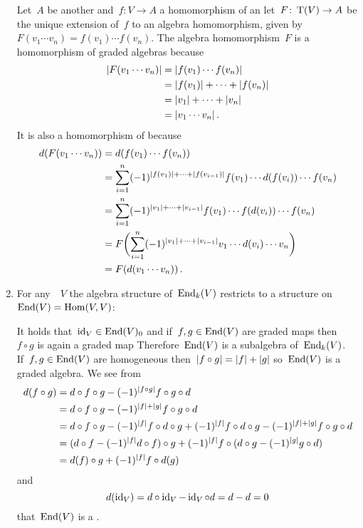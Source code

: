 \begin{enumerate}[start=2]
    Let~$A$ be another {\dga} and~$f \colon V \to A$ a homomorphism of {\dgvs} an let~$F \colon \operatorname{T}(V) \to A$ be the unique extension of~$f$ to an algebra homomorphism, given by~$F(v_1 \dotsm v_n) = f(v_1) \dotsm f(v_n)$.
    The algebra homomorphism~$F$ is a homomorphism of graded algebras because
    \begin{align*}
      \lvert F(v_1 \dotsm v_n)\rvert
      &=
      \lvert f(v_1) \dotsm f(v_n)\rvert
      \\
      &=
      \lvert f(v_1)\rvert + \dotsb + \lvert f(v_n)\rvert
      \\
      &=
      \lvert v_1\rvert + \dotsb + \lvert v_n\rvert
      \\
      &=
      \lvert v_1 \dotsm v_n\rvert \,.
    \end{align*}
    It is also a homomorphism of {\dgvs} because
    \begin{align*}
      d(F(v_1 \dotsm v_n))
      &=
      d( f(v_1) \dotsm f(v_n) )
      \\
      &=
      \sum_{i=1}^n
      (-1)^{\lvert f(v_1)\rvert + \dotsb + \lvert f(v_{i-1})\rvert }
      f(v_1) \dotsm d(f(v_i)) \dotsm f(v_n)
      \\
      &=
      \sum_{i=1}^n
      (-1)^{\lvert v_1\rvert + \dotsb + \lvert v_{i-1}\rvert }
      f(v_1) \dotsm f(d(v_i)) \dotsm f(v_n)
      \\
      &=
      F\biggl(
        \sum_{i=1}^n
        (-1)^{\lvert v_1\rvert + \dotsb + \lvert v_{i-1}\rvert }
        v_1 \dotsm d(v_i) \dotsm v_n
      \biggr)
      \\
      &=
      F(d(v_1 \dotsm v_n)) \,.
    \end{align*}
  \item
    For any~{\dgv}~$V$ the algebra structure of~$\operatorname{End}_k(V)$ restricts to a {\dga} structure on~$\operatorname{End}(V) = \operatorname{Hom}(V,V)$:
    
    It holds that~$\operatorname{id}_V \in \operatorname{End}(V)_0$ and if~$f, g \in \operatorname{End}(V)$ are graded maps then~$f \circ g$ is again a graded map
    Therefore~$\operatorname{End}(V)$ is a subalgebra of~$\operatorname{End}_k(V)$.
    If~$f, g \in \operatorname{End}(V)$ are homogeneous then~$\lvert f \circ g\rvert = \lvert f\rvert + \lvert g\rvert$ so~$\operatorname{End}(V)$ is a graded algebra.
    We see from
    \begin{align*}
      d(f \circ g)
      &=
      d \circ f \circ g
      -
      (-1)^{\lvert f \circ g\rvert} f \circ g \circ d
      \\
      &=
      d \circ f \circ g
      -
      (-1)^{\lvert f\rvert + \lvert g\rvert} f \circ g \circ d
      \\
      &=
      d \circ f \circ g
      -
      (-1)^{\lvert f\rvert}
      f \circ d \circ g
      +
      (-1)^{\lvert f\rvert}
      f \circ d \circ g
      -
      (-1)^{\lvert f\rvert + \lvert g\rvert} f \circ g \circ d
      \\
      &=
      (d \circ f - (-1)^{\lvert f\rvert} d \circ f) \circ g
      +
      (-1)^{\lvert f\rvert}
      f \circ (d \circ g - (-1)^{\lvert g\rvert} g \circ d)
      \\
      &=
      d(f) \circ g
      +
      (-1)^{\lvert f\rvert} f \circ d(g)
    \end{align*}
    and
    \[
      d( \operatorname{id}_V )
      =
      d \circ \operatorname{id}_V - \operatorname{id}_V \circ d
      =
      d - d
      =
      0
    \]
    that~$\operatorname{End}(V)$ is a {\dga}.
\end{enumerate}
